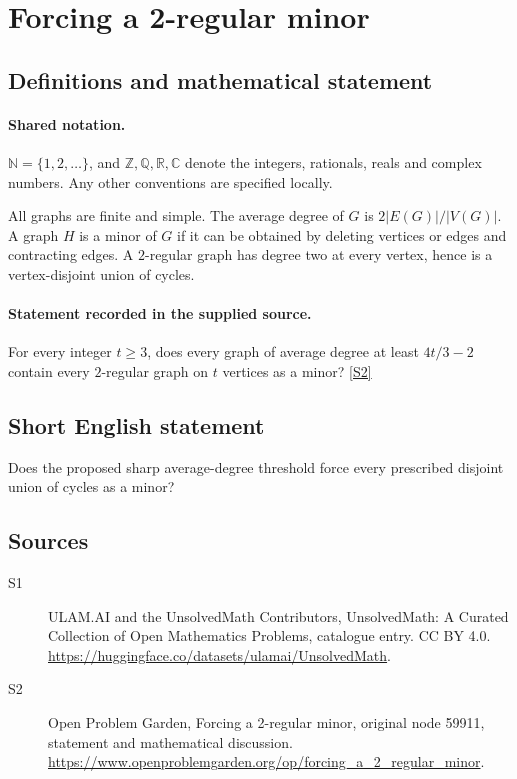 \documentclass[11pt]{article}
\newcommand{\sref}[2]{\hyperlink{source:#1:#2}{[S#2]}}
\begin{document}
\section{Forcing a 2-regular minor}\label{statement}

\subsection{Definitions and mathematical statement}

\paragraph{Shared notation.}$\mathbb N=\{1,2,\ldots\}$, and $\mathbb Z,\mathbb Q,\mathbb R,\mathbb C$ denote the integers, rationals, reals and complex numbers. Any other conventions are specified locally.


All graphs are finite and simple. The average degree of $G$ is $2|E(G)|/|V(G)|$. A graph $H$ is a minor of $G$ if it can be obtained by deleting vertices or edges and contracting edges. A $2$-regular graph has degree two at every vertex, hence is a vertex-disjoint union of cycles.
\paragraph{Statement recorded in the supplied source.}
For every integer $t\ge3$, does every graph of average degree at least $4t/3-2$ contain every $2$-regular graph on $t$ vertices as a minor? \sref{statement}{2}
\subsection{Short English statement}
Does the proposed sharp average-degree threshold force every prescribed disjoint union of cycles as a minor?
\subsection{Sources}
\begin{description}
\item[\hypertarget{source:statement:1}{S1}] ULAM.AI and the UnsolvedMath Contributors, UnsolvedMath: A Curated Collection of Open Mathematics Problems, catalogue entry. CC BY 4.0. \url{https://huggingface.co/datasets/ulamai/UnsolvedMath}.
\item[\hypertarget{source:statement:2}{S2}] Open Problem Garden, Forcing a 2-regular minor, original node 59911, statement and mathematical discussion. \url{https://www.openproblemgarden.org/op/forcing_a_2_regular_minor}.
\end{description}
\label{end:statement}
\end{document}
